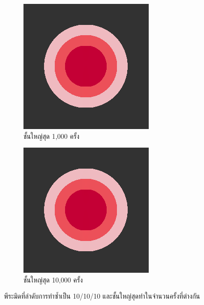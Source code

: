 \documentclass[hidelinks, a4paper,12pt]{article}
\numberwithin{equation}{section}							%
\numberwithin{equation}{section}
\begin{document}
{\begin{figure}[H]
\begin{subfigure}{0.4\linewidth}
			\centering
			\includegraphics[width=0.8\linewidth]{images/just10enough/only1000time.png}			
			\caption{ชั้นใหญ่สุด 1,000 ครั้ง}
		\end{subfigure}
		\begin{subfigure}{0.4\linewidth}
			\centering
			\includegraphics[width=0.8\linewidth]{images/just10enough/only10000time.png}			
			\caption{ชั้นใหญ่สุด 10,000 ครั้ง}
		\end{subfigure}
		\caption{พีระมิดที่ลำดับการทำซ้ำเป็น 10/10/10 และชั้นใหญ่สุดทำในจำนวนครั้งที่ต่างกัน}
	\end{figure}
	
}
\end{document}
